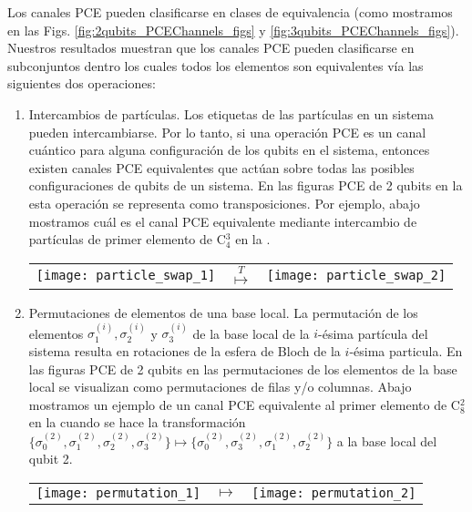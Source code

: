 Los canales PCE pueden clasificarse en clases de equivalencia (como 
mostramos en las Figs. \ref{fig:2qubits_PCEChannels_figs} y 
\ref{fig:3qubits_PCEChannels_figs}). 
Nuestros resultados muestran que los canales PCE pueden 
clasificarse en subconjuntos dentro los cuales todos 
los elementos son equivalentes vía las siguientes 
dos operaciones: 
\begin{enumerate}
	\item Intercambios de partículas. Los etiquetas de las partículas en un sistema pueden 
	intercambiarse. Por lo tanto, si una operación PCE es un canal cuántico 
	para alguna configuración de los qubits en el sistema, entonces existen canales 
	PCE equivalentes que actúan sobre todas las posibles configuraciones 
	de qubits de un sistema. En las figuras PCE de 2 qubits en la 
	 esta operación se representa como 
	transposiciones. Por ejemplo, abajo	mostramos cuál es el canal PCE equivalente 
	mediante intercambio de partículas de primer elemento  de C${}_4^3$ 
	en la .
	\begin{center}
	\begin{tabular}{P{2cm} P{1.5cm} P{2cm}}
		\texttt{[image: particle\_swap\_1]}
		& \hspace*{\fill} $\stackrel{T}{\longmapsto}$ \hspace*{\fill}
		& \texttt{[image: particle\_swap\_2]}
	\end{tabular}
	\end{center}
	
	\item Permutaciones de elementos de una base local. 
	La permutación de los 
	elementos $\sigma_1^{(i)},\sigma_2^{(i)}$ y $\sigma_3^{(i)}$ de la 
	base local de la $i$-ésima partícula del sistema resulta en rotaciones 
	de la esfera de Bloch de la $i$-ésima particula. 
	En las figuras PCE de 2 qubits en 
	las permutaciones de los elementos de la base local se visualizan 
	como permutaciones de filas y/o columnas.
	Abajo mostramos un ejemplo de un canal PCE equivalente al primer 
	elemento de C${}_8^2$ en la  cuando se hace la transformación
	$\{\sigma_0^{(2)},\sigma_1^{(2)},\sigma_2^{(2)},\sigma_3^{(2)}\}\mapsto
	\{\sigma_0^{(2)},\sigma_3^{(2)},\sigma_1^{(2)},\sigma_2^{(2)}\}$
	a la base local del qubit 2.
	\begin{center}
	\begin{tabular}{P{2cm} P{1.5cm} P{2cm}}
		\texttt{[image: permutation\_1]}
		& \hspace*{\fill} $\longmapsto$ \hspace*{\fill}
		& \texttt{[image: permutation\_2]}
	\end{tabular}
	\end{center}
\end{enumerate}
